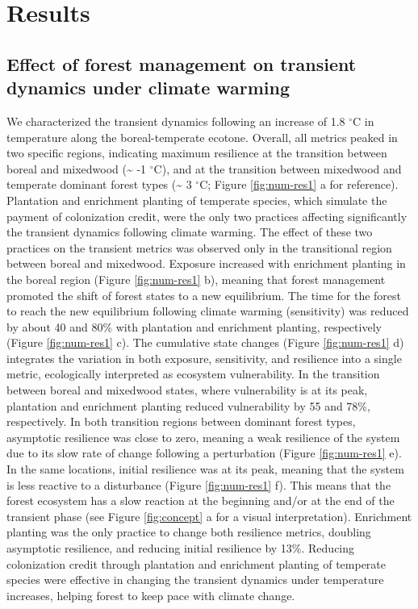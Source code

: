 \documentclass[12pt]{article}
\begin{document}
\hypertarget{results}{%
\section{Results}\label{results}}

\hypertarget{effect-of-forest-management-on-transient-dynamics-under-climate-warming}{%
\subsection{Effect of forest management on transient dynamics under
climate
warming}\label{effect-of-forest-management-on-transient-dynamics-under-climate-warming}}

We characterized the transient dynamics following an increase of 1.8
\(^{\circ}\)C in temperature along the boreal-temperate ecotone.
Overall, all metrics peaked in two specific regions, indicating maximum
resilience at the transition between boreal and mixedwood
(\textasciitilde{} -1 \(^{\circ}\)C), and at the transition between
mixedwood and temperate dominant forest types (\textasciitilde{} 3
\(^{\circ}\)C; Figure \ref{fig:num-res1} a for reference). Plantation
and enrichment planting of temperate species, which simulate the payment
of colonization credit, were the only two practices affecting
significantly the transient dynamics following climate warming. The
effect of these two practices on the transient metrics was observed only
in the transitional region between boreal and mixedwood. Exposure
increased with enrichment planting in the boreal region (Figure
\ref{fig:num-res1} b), meaning that forest management promoted the shift
of forest states to a new equilibrium. The time for the forest to reach
the new equilibrium following climate warming (sensitivity) was reduced
by about 40 and 80\% with plantation and enrichment planting,
respectively (Figure \ref{fig:num-res1} c). The cumulative state changes
(Figure \ref{fig:num-res1} d) integrates the variation in both exposure,
sensitivity, and resilience into a single metric, ecologically
interpreted as ecosystem vulnerability. In the transition between boreal
and mixedwood states, where vulnerability is at its peak, plantation and
enrichment planting reduced vulnerability by 55 and 78\%, respectively.
In both transition regions between dominant forest types, asymptotic
resilience was close to zero, meaning a weak resilience of the system
due to its slow rate of change following a perturbation (Figure
\ref{fig:num-res1} e). In the same locations, initial resilience was at
its peak, meaning that the system is less reactive to a disturbance
(Figure \ref{fig:num-res1} f). This means that the forest ecosystem has
a slow reaction at the beginning and/or at the end of the transient
phase (see Figure \ref{fig:concept} a for a visual interpretation).
Enrichment planting was the only practice to change both resilience
metrics, doubling asymptotic resilience, and reducing initial resilience
by 13\%. Reducing colonization credit through plantation and enrichment
planting of temperate species were effective in changing the transient
dynamics under temperature increases, helping forest to keep pace with
climate change.
\end{document}
